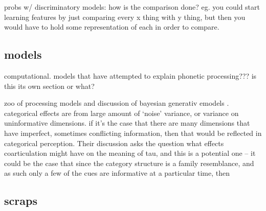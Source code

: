 \begin{multicols}{2}
probs w/ discriminatory models: how is the comparison done? eg. you could start learning features by just comparing every x thing with y thing, but then you would have to hold some representation of each in order to compare. 

\subsection{models}

computational. models that have attempted to explain phonetic processing??? is this its own section or what?

zoo of processing models and discussion of bayesian generativ emodels \cite{Kronrod2016a}. categorical effects are from large amount of `noise' variance, or variance on uninformative dimensions. if it's the case that there are many dimensions that have imperfect, sometimes conflicting information, then that would be reflected in categorical perception. Their discussion asks the question what effects coarticulation might have on the meaning of tau, and this is a potential one -- it could be the case that since the category structure is a family resemblance, and as such only a few of the cues are informative at a particular time, then 



\subsection{scraps}


\end{multicols}
